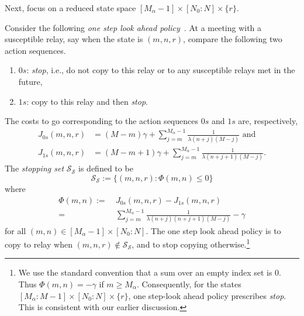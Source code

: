 \documentclass[10pt,journal,letterpaper]{IEEEtran}
\newcommand{\remove}[1]{}
\begin{document}
Next, focus on a reduced state space $[M_{\alpha}-1] \times
[N_0:N] \times \{r\}$.
 \remove{ We cast the problem as a {\it stopping
problem}~\cite[Section~3.4]{stochctrl.bertsekas07dpoc-vol2}. Towards
this, we define an special $stop$ action which implies that no
copying is done to the susceptible relay met at present or those to
be met in the future. Alternatively, $stop$ is equivalent to a sequence
of actions $0,0,0,\dots$.
Clearly, if we choose
action $stop$ at a state $(m,n,r)$, the stopping cost, $sc(m,n,r)$,
is the expected time to go until the desired fraction of
destinations are infected. It can be easily verified that, for all
$(m,n) \in [M_{\alpha}-1] \times [N_0:N]$,
\begin{equation*}
sc(m,n,r) = (M-m)\gamma + \sum_{j =
m}^{M_{\alpha}-1}\frac{1}{\lambda(n+j)(M-j)}.
\end{equation*}
The one-step stopping set is defined as
\begin{equation*}
\mathcal{SS} = \left\{s \in [M_{\alpha}-1] \times [N_0:N] \times
\{r\} | sc(s) \leq min_{u \in \mathcal{U}}\left(g(s,u) +
\mathbb{E}(sc(s'|s,u,e'))\right) \right\},
\end{equation*}
where, as before, $e'$ and $s'$ denote the random disturbance and
the next state, respectively.
}
Consider the following {\it one step look
ahead policy}~\cite[Section~3.4]{stochctrl.bertsekas07dpoc-vol2}. At
a meeting with a susceptible relay, say when the state is $(m,n,r)$, compare
the following two action sequences.
\begin{enumerate}
\item $0s$: {\it stop}, i.e., do not copy to this relay or to any susceptible relays met in the future,
\item $1s$: copy to this relay and then {\it stop}.
\end{enumerate}
The costs to go corresponding to the action sequences
$0s$ and $1s$ are, respectively,
\begin{align*}
J_{0s}(m,n,r) &= (M-m)\gamma + \sum_{j = m}^{M_{\alpha}-1}\frac{1}{\lambda(n+j)(M-j)} \mbox{ and} \\
J_{1s}(m,n,r) &=  (M-m +1)\gamma + \sum_{j =
m}^{M_{\alpha}-1}\frac{1}{\lambda(n+j+1)(M-j)}.
\end{align*}
The {\it stopping set} $\mathcal{S_S}$ is defined to be
\begin{equation}
\mathcal{S_S} := \{(m,n,r):\Phi(m,n) \leq 0\} \label{eqn:stopping-set}
\end{equation}
where
\begin{align}
 \Phi(m,n) := &~J_{0s}(m,n,r) - J_{1s}(m,n,r)\nonumber \\
  = &~\sum_{j =m}^{M_{\alpha}-1}\frac{1}{\lambda(n+j)(n+j+1)(M-j)} - \gamma \label{eqn:Phi}
\end{align}
for all $(m,n) \in [M_{\alpha}-1] \times [N_0:N]$.
The one step look ahead policy is to copy to relay
when $(m,n,r) \notin \mathcal{S_S}$, and to stop copying otherwise.\footnote{We use the standard convention that a sum over an
empty index set is $0$. Thus $\Phi(m,n) = -\gamma$ if $m \geq
M_{\alpha}$. Consequently, for the states $[M_{\alpha}:M-1] \times [N_0:N] \times \{r\}$, one step-look ahead
policy prescribes {\it stop}. This is consistent with our earlier discussion.}
\end{document}
